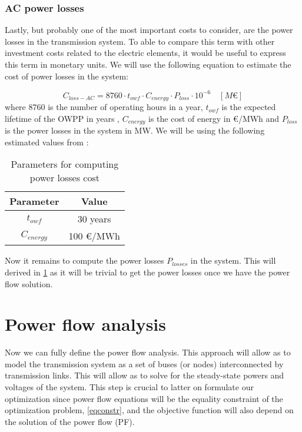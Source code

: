 \documentclass[a4paper,11pt, titlepage, twoside]{article}
\begin{document}
\subsubsection{AC power losses}
Lastly, but probably one of the most important costs to consider, are the power losses in the transmission system. To able to compare this term with other investment costs related to the electric elements,
it would be useful to express this term in monetary units. We will use the following equation to estimate the cost of power losses in the system:

\begin{equation}\label{eq:lossescost}
    C_{loss-AC} = 8760 \cdot t_{owf} \cdot C_{energy} \cdot P_{loss} \cdot 10^{-6} \quad \left[M\euro\right]
\end{equation}
where $8760$ is the number of operating hours in a year, $t_{owf}$ is the expected lifetime of the OWPP in years , $C_{energy}$ is the cost of energy in \euro/MWh and $P_{loss}$ is the power losses in the system in MW. We will be using the
following estimated values from \cite{paperbase}:
\begin{table}[h]
    \centering
    \begin{tabular}{c|c}
    \hline
    \textbf{Parameter} & \textbf{Value} \\
    \hline
    $t_{owf}$ & 30 years \\ 
    $C_{energy}$ & 100 \euro/MWh  \\
    \hline
    \end{tabular}
    \caption{Parameters for computing power losses cost \cite{paperbase}}
    \label{tab:lossescost}
\end{table}

Now it remains to compute the power losses $P_{losses}$ in the system. This will derived in \ref{fulltransmission} as it will be trivial to get
the power losses once we have the power flow solution.

\section{Power flow analysis} \label{fulltransmission}

Now we can fully define the power flow analysis.  This approach will allow as to model the transmission system as a set of buses (or nodes)
interconnected by transmission links. This will allow as to solve for the steady-state powers and voltages of the system. This step is crucial to latter on
formulate our optimization since power flow equations will be the equality constraint of the optimization problem, \ref{eqconstr}, and the objective function will also depend on the solution of the power flow (PF).
\end{document}
